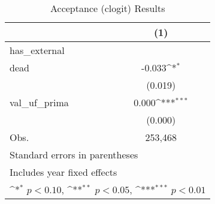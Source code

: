 \begin{table}[htbp]\centering
\def\sym#1{\ifmmode^{#1}\else\(^{#1}\)\fi}
\caption{Acceptance (clogit) Results}
\begin{tabular}{l*{1}{c}}
\hline\hline
                    &\multicolumn{1}{c}{(1)}         \\
\hline
has\_external        &                     \\
dead                &      -0.033\sym{*}  \\
                    &     (0.019)         \\
[1em]
val\_uf\_prima        &       0.000\sym{***}\\
                    &     (0.000)         \\
\hline
Obs.                &     253,468         \\
\hline\hline
\multicolumn{2}{l}{\footnotesize Standard errors in parentheses}\\
\multicolumn{2}{l}{\footnotesize Includes year fixed effects}\\
\multicolumn{2}{l}{\footnotesize \sym{*} \(p<0.10\), \sym{**} \(p<0.05\), \sym{***} \(p<0.01\)}\\
\end{tabular}
\end{table}
